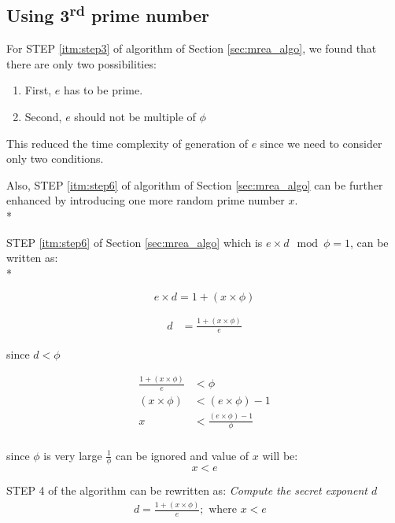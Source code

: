 \documentclass[12pt,journal,compsoc]{IEEEtran}
\begin{document}
\par

\subsection{\bf Using 3\textsuperscript{rd} prime number}%
\par \par
For STEP \ref{itm:step3} of algorithm of Section \ref{sec:mrea_algo}, we found that there are only two possibilities:

\begin{enumerate}
	\item First, $e$ has to be prime.
	\item Second, $e$ should not be multiple of $\phi$
\end{enumerate}
This reduced the time complexity of generation of $e$ since we need to consider only two conditions.

Also, STEP \ref{itm:step6} of algorithm of Section \ref{sec:mrea_algo} can be further enhanced by introducing one more random prime number $x$. \\*

STEP \ref{itm:step6} of Section \ref{sec:mrea_algo} which is $e \times d \mod \phi = 1$, can be written as:\\* 

\begin{equation}
e \times d = 1 + (x \times \phi)
\end{equation}

\begin{align*}
	d &= \frac{1 + (x\times\phi)}{e}
\end{align*}

since $d < \phi$

\begin{align*}
	\frac{1 + (x \times \phi)}{e} &< \phi \\
	(x \times \phi) &< (e \times \phi) -1 \\
	x &< \frac{(e \times \phi) -1}{\phi} \\
\end{align*}

since $\phi$ is very large $\frac{1}{\phi}$ can be ignored and value of $x$ will be:
\begin{equation}
	x < e
\end{equation}


STEP 4 of the algorithm can be rewritten as:
\emph{Compute the secret exponent $d$}
	\begin{align}
		d = \frac{1 + (x \times \phi)}{e}; \text{ where } x < e&
	\end{align}
	
\end{document}
